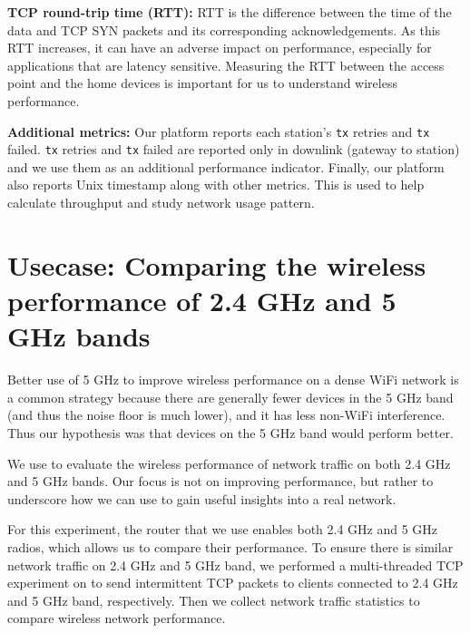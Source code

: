 \textbf{TCP round-trip time (RTT):} RTT is the difference between the time of the data and TCP SYN packets and its corresponding acknowledgements. As this RTT increases, it can have an adverse impact on performance, especially for applications that are latency sensitive. Measuring the RTT between the access point and the home devices is important for us to understand wireless performance.

\textbf{Additional metrics:} Our platform reports each station's \texttt{tx} retries and \texttt{tx} failed. \texttt{tx} retries and \texttt{tx} failed are reported only in downlink (gateway to station) and we use them as an additional performance indicator. Finally, our platform also reports Unix timestamp along with other metrics. This is used to help calculate throughput and study network usage pattern.

\section{Usecase: Comparing the wireless performance of 2.4 GHz and 5 GHz bands}
\label{sec.usecase1}

Better use of 5 GHz to improve wireless performance on a dense WiFi network is a common strategy because there are generally fewer devices in the 5 GHz band (and thus the noise floor is much lower), and it has less non-WiFi interference. Thus our hypothesis was that devices on the 5 GHz band would perform better.

We use \sysname to evaluate the wireless performance of network traffic on both 2.4 GHz and 5 GHz bands. Our focus is not on improving performance, but rather to underscore how we can use \sysname to gain useful insights into a real network.

For this experiment, the router that we use enables both 2.4 GHz and 5 GHz radios, which allows us to compare their performance. To ensure there is similar network traffic on 2.4 GHz and 5 GHz band, we performed a multi-threaded TCP experiment on \sysname to send intermittent TCP packets to clients connected to 2.4 GHz and 5 GHz band, respectively. Then we collect network traffic statistics to compare wireless network performance.

